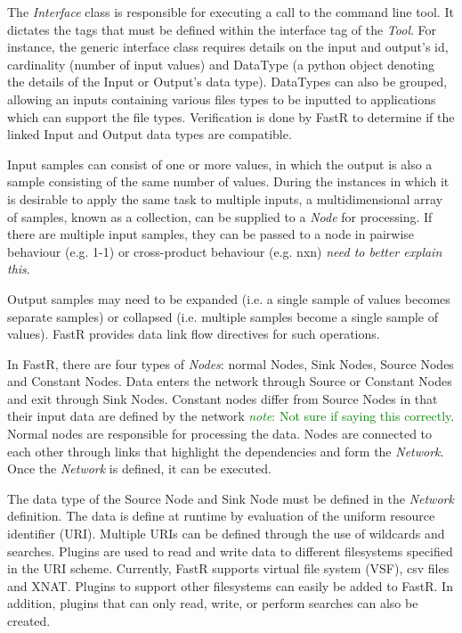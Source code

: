\documentclass{report}
\newcommand{\note}[1]{\textcolor{green}{\textit{note}: #1}}
\begin{document}
The \textit{Interface} class is responsible for executing a call to the command line tool.
It dictates the tags that must be defined within the interface tag of the
\textit{Tool}. For instance, the generic interface class requires details on the
input and output's id, cardinality (number of input values) and DataType (a
python object denoting the details of the Input or Output's data type).
DataTypes can also be grouped, allowing an inputs containing various files types
to be inputted to applications which can support the file types.
Verification is done by FastR to determine if the linked Input and Output data
types are compatible.

Input samples can consist of one or more values, in which the output is also a
sample consisting of the same number of values. During the instances in which it
is desirable to apply the same task to multiple inputs, a multidimensional array of samples, known as a collection, can be supplied to a
\textit{Node} for processing. If there are multiple input samples, they can be
passed to a node in pairwise behaviour (e.g. 1-1) or cross-product behaviour
(e.g. nxn) \textit{need to better explain this}.  

Output samples may need to be expanded (i.e. a single sample of values becomes separate
samples) or collapsed (i.e. multiple samples become a single sample of values).
FastR provides data link flow directives for such operations.

In FastR, there are four types of \textit{Nodes}: normal Nodes, Sink Nodes,
Source Nodes and Constant Nodes. Data enters the network through Source or
Constant Nodes and exit through Sink Nodes. Constant nodes differ from Source
Nodes in that their input data are defined by the network \note{Not sure if
saying this correctly}. Normal nodes are responsible for processing the
data. Nodes are connected to each other through links that highlight the
dependencies and form the \textit{Network}. Once the \textit{Network} is
defined, it can be executed.

The data type of the Source Node and Sink Node must be defined in the
\textit{Network} definition.
The data is define at runtime by evaluation of the uniform resource identifier
(URI). Multiple URIs can be defined through the use of wildcards and searches. Plugins are used to read and write data to
different filesystems specified in the URI scheme. Currently, FastR supports
virtual file system (VSF), csv files and XNAT. Plugins to support other
filesystems can easily be added to FastR. In addition, plugins that can only
read, write, or perform searches can also be created.   
\end{document}
